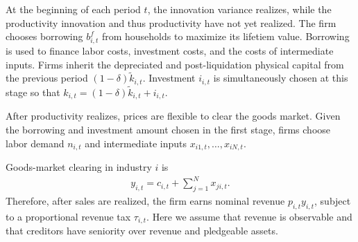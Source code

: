 \documentclass[12pt]{article}
\numberwithin{equation}{section}
\begin{document}
At the beginning of each period $t$, the innovation variance realizes, while the productivity innovation and thus productivity have not yet realized. The firm chooses borrowing $b^f_{i,t}$ from households to maximize its lifetiem value. Borrowing is used to finance labor costs, investment costs, and the costs of intermediate inputs. Firms inherit the depreciated and post-liquidation physical capital from the previous period $(1-\delta)\tilde{k}_{i,t}$. Investment $i_{i,t}$ is simultaneously chosen at this stage so that $k_{i,t} = (1-\delta) \tilde{k}_{i,t} + i_{i,t}$.

After productivity realizes, prices are flexible to clear the goods market. Given the borrowing and investment amount chosen in the first stage, firms choose labor demand $n_{i,t}$ and intermediate inputs $x_{i1,t},\ldots,x_{iN,t}$.

Goods-market clearing in industry $i$ is
\begin{align}\label{eq:goods_market_clearing}
    y_{i,t}
    =
    c_{i,t}+\sum_{j=1}^{N}x_{ji,t}.
\end{align}
Therefore, after sales are realized, the firm earns nominal revenue $p_{i,t} y_{i,t}$, subject to a proportional revenue tax $\tau_{i,t}$. Here we assume that revenue is observable and that creditors have seniority over revenue and pledgeable assets.
\end{document}
